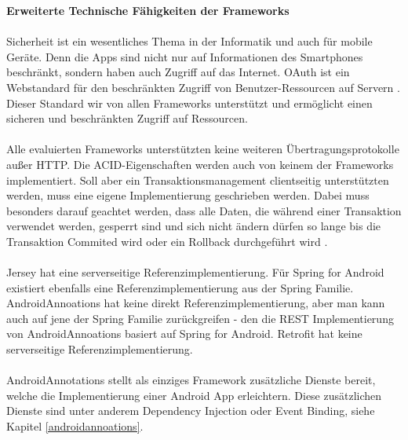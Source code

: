 {\large \textbf{Erweiterte Technische Fähigkeiten der Frameworks}}\\\\
Sicherheit ist ein wesentliches Thema in der Informatik und auch für mobile Geräte. Denn die Apps sind nicht nur auf Informationen des Smartphones beschränkt, sondern haben auch Zugriff auf das Internet. OAuth ist ein Webstandard für den beschränkten Zugriff von Benutzer-Ressourcen auf Servern \cite{shehab:secure}. Dieser Standard wir von allen Frameworks unterstützt und ermöglicht einen sicheren und beschränkten Zugriff auf Ressourcen. 
\\\\
Alle evaluierten Frameworks unterstützten keine weiteren Übertragungsprotokolle außer HTTP. Die ACID-Eigenschaften werden auch von keinem der Frameworks implementiert. Soll aber ein Transaktionsmanagement clientseitig unterstützten werden, muss eine eigene Implementierung geschrieben werden. Dabei muss besonders darauf geachtet werden, dass alle Daten, die während einer Transaktion verwendet werden, gesperrt sind und sich nicht ändern dürfen so lange bis die Transaktion Commited wird oder ein Rollback durchgeführt wird \cite{braun:Transaktionen}.
\\\\
Jersey hat eine serverseitige Referenzimplementierung. Für Spring for Android existiert ebenfalls eine Referenzimplementierung aus der Spring Familie. AndroidAnnoations hat keine direkt Referenzimplementierung, aber man kann auch auf jene der Spring Familie zurückgreifen - den die REST Implementierung von AndroidAnnoations basiert auf Spring for Android. Retrofit hat keine serverseitige Referenzimplementierung.
\\\\
AndroidAnnotations stellt als einziges Framework zusätzliche Dienste bereit, welche die Implementierung einer Android App erleichtern. Diese zusätzlichen Dienste sind unter anderem Dependency Injection oder Event Binding, siehe Kapitel \ref{androidannoations}.
  
